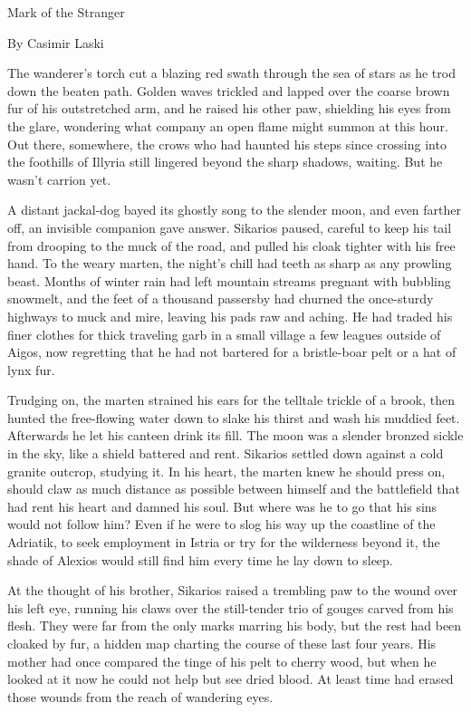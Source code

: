 
Mark of the Stranger

By Casimir Laski

The wanderer's torch cut a blazing red swath through the sea of stars as he trod down the beaten path. Golden waves trickled and lapped over the coarse brown fur of his outstretched arm, and he raised his other paw, shielding his eyes from the glare, wondering what company an open flame might summon at this hour. Out there, somewhere, the crows who had haunted his steps since crossing into the foothills of Illyria still lingered beyond the sharp shadows, waiting. But he wasn't carrion yet.

A distant jackal-dog bayed its ghostly song to the slender moon, and even farther off, an invisible companion gave answer. Sikarios paused, careful to keep his tail from drooping to the muck of the road, and pulled his cloak tighter with his free hand. To the weary marten, the night's chill had teeth as sharp as any prowling beast. Months of winter rain had left mountain streams pregnant with bubbling snowmelt, and the feet of a thousand passersby had churned the once-sturdy highways to muck and mire, leaving his pads raw and aching. He had traded his finer clothes for thick traveling garb in a small village a few leagues outside of Aigos, now regretting that he had not bartered for a bristle-boar pelt or a hat of lynx fur.

Trudging on, the marten strained his ears for the telltale trickle of a brook, then hunted the free-flowing water down to slake his thirst and wash his muddied feet. Afterwards he let his canteen drink its fill. The moon was a slender bronzed sickle in the sky, like a shield battered and rent. Sikarios settled down against a cold granite outcrop, studying it. In his heart, the marten knew he should press on, should claw as much distance as possible between himself and the battlefield that had rent his heart and damned his soul. But where was he to go that his sins would not follow him? Even if he were to slog his way up the coastline of the Adriatik, to seek employment in Istria or try for the wilderness beyond it, the shade of Alexios would still find him every time he lay down to sleep.

At the thought of his brother, Sikarios raised a trembling paw to the wound over his left eye, running his claws over the still-tender trio of gouges carved from his flesh. They were far from the only marks marring his body, but the rest had been cloaked by fur, a hidden map charting the course of these last four years. His mother had once compared the tinge of his pelt to cherry wood, but when he looked at it now he could not help but see dried blood. At least time had erased those wounds from the reach of wandering eyes.

